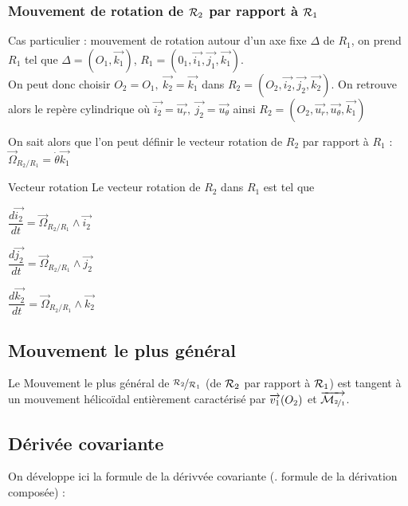 \documentclass[a4paper,french,bookmarks]{book}
\begin{document}
    \subsubsection{Mouvement de rotation de $\mathcal{R}_2$ par rapport à $\mathcal{R}_1$}
    
    Cas particulier : mouvement de rotation autour d'un axe fixe \(\Delta\) de \(R_1\), on prend \(R_1\) tel que \(\Delta = (O_1, \vec{k_1})\), \(R_1 = (0_1, \vec{i_1}, \vec{j_1}, \vec{k_1})\). \\
    On peut donc choisir \(O_2 = O_1,\  \vec{k_2} = \vec{k_1}\) dans \(R_2 = (O_2, \vec{i_2}, \vec{j_2}, \vec{k_2})\). On retrouve alors le repère cylindrique où \(\vec{i_2} = \vec{u_r},\ \vec{j_2} = \vec{u_{\theta}}\) ainsi \(R_2 = (O_2, \vec{u_r}, \vec{u_{\theta}}, \vec{k_1})\) \newline

    On sait alors que l'on peut définir le vecteur rotation de \(R_2\) par rapport à \(R_1\) : \(\vec{\Omega}_{R_2/R_1} = \dot{\theta}\vec{k_1}\)

    \begin{definition}{Vecteur rotation}{}
        Le vecteur rotation de \(R_2\) dans \(R_1\) est tel que 
        \begin{enumerate}
            \itt \( \dfrac{d \vec{i_2}}{dt} = \vec{\Omega}_{R_2/R_1} \wedge \vec{i_2}\)

            \itt \( \dfrac{d \vec{j_2}}{dt} = \vec{\Omega}_{R_2/R_1} \wedge \vec{j_2}\)

            \itt \( \dfrac{d \vec{k_2}}{dt} = \vec{\Omega}_{R_2/R_1} \wedge \vec{k_2}\)
        \end{enumerate}
    \end{definition}
    
    \subsection{Mouvement le plus général}
    
    Le Mouvement le plus général de $\nicefrac{\mathcal{R}_2}{\mathcal{R}_1}$ (de $\mathcal{R}_2$ par rapport à $\mathcal{R}_1$) est tangent à un mouvement hélicoïdal entièrement caractérisé par $\overrightarrow{v_1}\!\left(O_2\right)$ et $\overrightarrow{\mathcal{M}_{\nicefrac{2}{1}}}$.
    
    \subsection{Dérivée covariante}
    
    On développe ici la formule de la dérivvée covariante (\ie. formule de la dérivation composée) :
    
\end{document}
